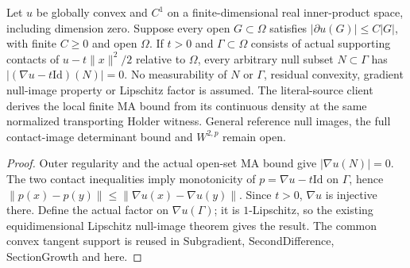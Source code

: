 \begin{lemma}
  \label{lem:convex-contact-null-image}
  \leanok
  Let $u$ be globally convex and $C^1$ on a finite-dimensional real inner-product
  space, including dimension zero. Suppose every open $G\subset\Omega$ satisfies
  $|\partial u(G)|\le C|G|$, with finite $C\ge0$ and open $\Omega$.
  If $t>0$ and $\Gamma\subset\Omega$ consists of actual supporting contacts of
  $u-t\|x\|^2/2$ relative to $\Omega$, every arbitrary null subset $N\subset\Gamma$
  has $|(\nabla u-t\mathrm{Id})(N)|=0$. No measurability of $N$ or $\Gamma$,
  residual convexity, gradient null-image property or Lipschitz factor is assumed.
  The literal-source client derives the local finite MA bound from its continuous
  density at the same normalized transporting Holder witness. General reference
  null images, the full contact-image determinant bound and $W^{2,p}$ remain open.
\end{lemma}
\begin{proof}
  \leanok
  Outer regularity and the actual open-set MA bound give $|\nabla u(N)|=0$.
  The two contact inequalities imply monotonicity of $p=\nabla u-t\mathrm{Id}$
  on $\Gamma$, hence $\|p(x)-p(y)\|\le\|\nabla u(x)-\nabla u(y)\|$.
  Since $t>0$, $\nabla u$ is injective there. Define the actual factor on
  $\nabla u(\Gamma)$; it is $1$-Lipschitz, so the existing equidimensional
  Lipschitz null-image theorem gives the result. The common convex tangent
  support is reused in Subgradient, SecondDifference, SectionGrowth and here.
\end{proof}


